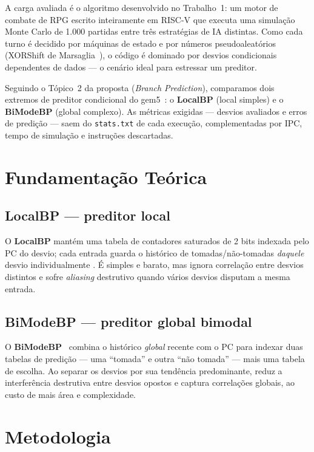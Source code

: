 \documentclass[12pt]{article}
\begin{document}
A carga avaliada é o algoritmo desenvolvido no Trabalho~1: um motor de
combate de RPG escrito inteiramente em RISC-V que executa uma simulação
Monte Carlo de 1.000 partidas entre três estratégias de IA distintas.
Como cada turno é decidido por máquinas de estado e por números
pseudoaleatórios (XORShift de Marsaglia~\cite{marsaglia2003xorshift}), o
código é dominado por desvios condicionais dependentes de dados --- o
cenário ideal para estressar um preditor.

Seguindo o Tópico~2 da proposta (\emph{Branch Prediction}), comparamos
dois extremos de preditor condicional do gem5~\cite{binkert2011gem5}: o
\textbf{LocalBP} (local simples) e o \textbf{BiModeBP} (global complexo).
As métricas exigidas --- desvios avaliados e erros de predição --- saem do
\texttt{stats.txt} de cada execução, complementadas por IPC, tempo de
simulação e instruções descartadas.

\section{Fundamentação Teórica}

\subsection{LocalBP --- preditor local}

O \textbf{LocalBP} mantém uma tabela de contadores saturados de 2 bits
indexada pelo PC do desvio; cada entrada guarda o histórico de
tomadas/não-tomadas \emph{daquele} desvio individualmente
\cite{smith1981branch}. É simples e barato, mas ignora correlação entre
desvios distintos e sofre \emph{aliasing} destrutivo quando vários desvios
disputam a mesma entrada.

\subsection{BiModeBP --- preditor global bimodal}

O \textbf{BiModeBP}~\cite{lee1997bimode} combina o histórico \emph{global}
recente com o PC para indexar duas tabelas de predição --- uma ``tomada''
e outra ``não tomada'' --- mais uma tabela de escolha. Ao separar os
desvios por sua tendência predominante, reduz a interferência destrutiva
entre desvios opostos e captura correlações globais, ao custo de mais área
e complexidade.

\section{Metodologia}
\end{document}
